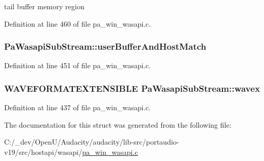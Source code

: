 tail buffer memory region 



Definition at line 460 of file pa\+\_\+win\+\_\+wasapi.\+c.

\subsubsection[{\texorpdfstring{user\+Buffer\+And\+Host\+Match}{userBufferAndHostMatch}}]{ Pa\+Wasapi\+Sub\+Stream\+::user\+Buffer\+And\+Host\+Match}\hypertarget{struct_pa_wasapi_sub_stream_a7158c290cfa44a35117a04283b6f0fa2}{}\label{struct_pa_wasapi_sub_stream_a7158c290cfa44a35117a04283b6f0fa2}


Definition at line 451 of file pa\+\_\+win\+\_\+wasapi.\+c.

\subsubsection[{\texorpdfstring{wavex}{wavex}}]{\setlength{\rightskip}{0pt plus 5cm}W\+A\+V\+E\+F\+O\+R\+M\+A\+T\+E\+X\+T\+E\+N\+S\+I\+B\+LE Pa\+Wasapi\+Sub\+Stream\+::wavex}\hypertarget{struct_pa_wasapi_sub_stream_a67dc95f3c6d0de9a8f7e85e5a98daada}{}\label{struct_pa_wasapi_sub_stream_a67dc95f3c6d0de9a8f7e85e5a98daada}


Definition at line 437 of file pa\+\_\+win\+\_\+wasapi.\+c.



The documentation for this struct was generated from the following file\+:\begin{DoxyCompactItemize}
\item 
C\+:/\+\_\+dev/\+Open\+U/\+Audacity/audacity/lib-\/src/portaudio-\/v19/src/hostapi/wasapi/\hyperlink{pa__win__wasapi_8c}{pa\+\_\+win\+\_\+wasapi.\+c}\end{DoxyCompactItemize}
